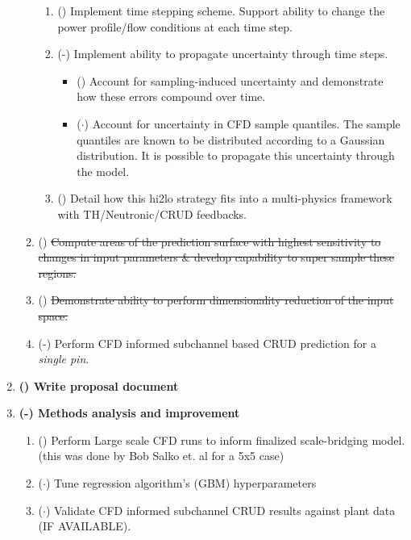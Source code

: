 \begin{enumerate}
\begin{enumerate}
        \begin{enumerate}
            \item (\checkmark) Implement time stepping scheme.  Support ability to change the power profile/flow conditions at each time step.
            \item (\checkmark-) Implement ability to propagate uncertainty through time steps.
            \begin{itemize}
                \item (\checkmark) Account for sampling-induced uncertainty and demonstrate how these errors compound over time.
                \item ($\cdot$) {\color{blue} Account for uncertainty in CFD sample quantiles. The sample quantiles are known
                                    to be distributed according to a Gaussian distribution.  It is possible to propagate
                                    this uncertainty through the model.}
            \end{itemize}
        \item (\checkmark) {\color{blue} Detail how this hi2lo strategy fits into a multi-physics framework with TH/Neutronic/CRUD feedbacks.}
        \end{enumerate}
        \item (\xmark) \sout{Compute areas of the prediction surface with highest
                             sensitivity to changes in input parameters \& develop capability to super sample these regions.}
        \item (\xmark) \sout{Demonstrate ability to perform dimensionality reduction of the input space.}
        \item (\checkmark-) Perform CFD informed subchannel based CRUD prediction for a \emph{single pin}.
    \end{enumerate}
\item \textbf{(\checkmark) Write proposal document}
\item \textbf{(\checkmark-) Methods analysis and improvement}
    \begin{enumerate}
        \item (\checkmark) Perform Large scale CFD runs to inform finalized scale-bridging model.  (this was done by Bob Salko et. al for a 5x5 case)
        \item ($\cdot$) Tune regression algorithm's (GBM) hyperparameters
        \item ($\cdot$) Validate CFD informed subchannel CRUD results against plant data (IF AVAILABLE).

\end{enumerate}
\end{enumerate}
